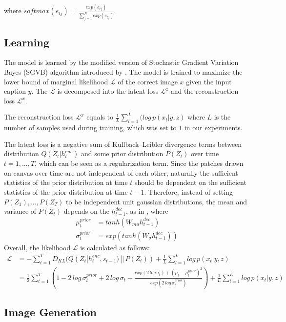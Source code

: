 \documentclass{article} %
\newcommand{\hdec}{h^{dec}}
\newcommand{\henc}{h^{enc}}
\newcommand{\Lat}{Z}
\newcommand{\post}{Q}
\newcommand{\prior}{P}
\newcommand{\loss}{\mathcal{L}}
\newcommand{\lloss}{\mathcal{L}^{z}}
\newcommand{\rloss}{\mathcal{L}^{x}}
\begin{document}
where $softmax(e_{tj}) = \frac{exp(e_{tj})}{\sum_{j=1}^{N}exp(e_{tj})}$

\subsection{Learning}

The model is learned by the modified version of Stochastic Gradient Variation Bayes (SGVB) algorithm introduced by \cite{kingma_vae}. The model is trained to maximize the lower bound of marginal likelihood $\loss$ of the correct image $x$ given the input caption $y$. The $\loss$ is decomposed into the latent loss $\lloss$ and the reconstruction loss $\rloss$. 

The reconstruction loss $\rloss$ equals to $\frac{1}{L}\sum_{l=1}^{L}(log\,p(x_{t}|y,z)$ where $L$ is the number of samples used during training, which was set to $1$ in our experiments.

The latent loss is a negative sum of Kullback--Leibler divergence terms between distribution $\post(\Lat_t|\henc_t)$ and some prior distribution ${\prior(\Lat_t)}$ over time $t=1,...,T$, which can be seen as a regularization term. Since the patches drawn on canvas over time are not independent of each other, naturally the sufficient statistics of the prior distribution at time $t$ should be dependent on the sufficient statistics of the prior distribution at time $t-1$. Therefore, instead of setting $\prior(\Lat_1), ..., \prior(\Lat_T)$ to be independent unit gaussian distributions, the mean and variance of $\prior(\Lat_t)$ depends on the $\hdec_{t-1}$, as in \citep{bachman_sdm}, where 
\begin{align}
\mu_{t}^{prior} &= tanh(W_{mu}\hdec_{t-1})\\
\sigma_{t}^{prior} &= exp(tanh(W_{\sigma}\hdec_{t-1})) 
\end{align}
Overall, the likelihood $\loss$ is calculated as follows:
\begin{align}
\loss &= -\sum_{t=1}^{T}D_{KL}(\post(\Lat_t|\henc_t,s_{t-1})\,||\,\prior(\Lat_t)) + \frac{1}{L}\sum_{l=1}^{L}log\,p(x_{t}|y,z)\\
&=
\frac{1}{2}\sum_{t=1}^{T}(1 - 2\,log\,\sigma_{t}^{prior} + 2\,log\,\sigma_{t} - \frac{exp(2\,log\,\sigma_{t}) + (\mu_{t} - \mu_{t}^{prior})^{2}}{exp(2\,log\,\sigma_{t}^{prior})}) + \frac{1}{L}\sum_{l=1}^{L}log\,p(x_{t}|y,z)
\end{align}

\subsection{Image Generation}
\end{document}
